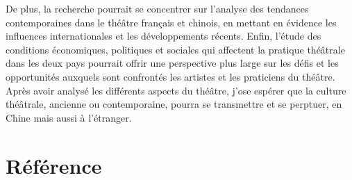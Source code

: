\documentclass[UTF8,a4paper,12pt]{ctexart}
\numberwithin{equation}{section}
\begin{document}
De plus, la recherche pourrait se concentrer sur l'analyse des tendances contemporaines dans le théâtre français et chinois, en mettant en évidence les influences internationales et les développements récents. Enfin, l'étude des conditions économiques, politiques et sociales qui affectent la pratique théâtrale dans les deux pays pourrait offrir une perspective plus large sur les défis et les opportunités auxquels sont confrontés les artistes et les praticiens du théâtre. Après avoir analysé les différents aspects du théâtre, j'ose espérer que la culture théâtrale, ancienne ou contemporaine,  pourra se transmettre et se perptuer, en Chine mais aussi à l'étranger.

\newpage
{}
\section*{Référence}
\begingroup  %
\renewcommand{\section}[2]{}
\printbibliography
\endgroup

%

%
%
%
%
%
%
%
%
%
%
\end{document}
